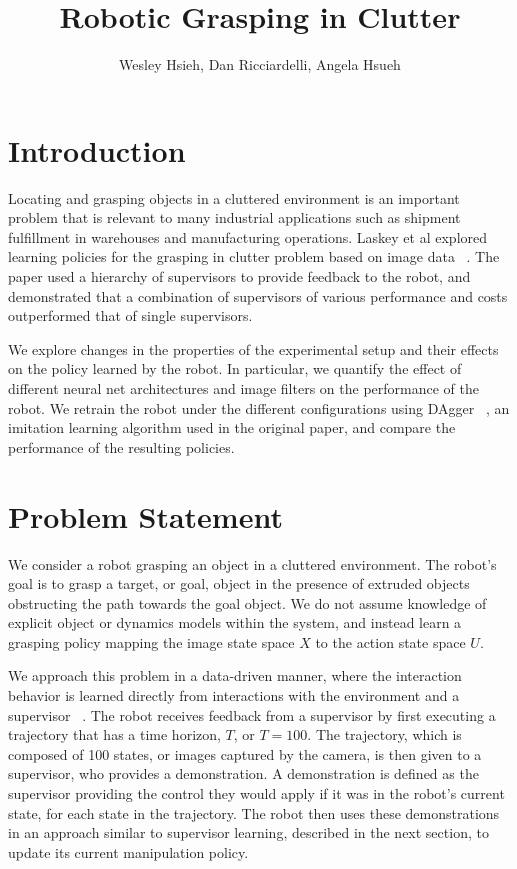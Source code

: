 \documentclass[10pt, conference]{ieeeconf}      %
\title{Robotic Grasping in Clutter}
\author{Wesley Hsieh, Dan Ricciardelli, Angela Hsueh}
\begin{document}
\maketitle
\thispagestyle{empty}
\pagestyle{empty}


\section{Introduction} 
Locating and grasping objects in a cluttered environment is an important problem that is relevant to many industrial applications such as shipment fulfillment in warehouses and manufacturing operations. Laskey et al explored learning policies for the grasping in clutter problem based on image data ~\cite{hierarchical_supervisors}. The paper used a hierarchy of supervisors to provide feedback to the robot, and demonstrated that a combination of supervisors of various performance and costs outperformed that of single supervisors. 

We explore changes in the properties of the experimental setup and their effects on the policy learned by the robot. In particular, we quantify the effect of different neural net architectures and image filters on the performance of the robot. We retrain the robot under the different configurations using DAgger ~\cite{ross2010reduction}, an imitation learning algorithm used in the original paper, and compare the performance of the resulting policies.

\section{Problem Statement}
We consider a robot grasping an object in a cluttered
environment. The robot's goal is to grasp a target, or goal,
object in the presence of extruded objects obstructing the
path towards the goal object. We do not assume knowledge of explicit
object or dynamics models within the system, and instead learn a grasping policy mapping the image state space $X$ to the action state space $U$. 

We approach this problem in a data-driven manner, where the interaction behavior is
learned directly from interactions with the environment and
a supervisor ~\cite{argall2009survey}. The robot receives feedback from a supervisor by first executing a trajectory that has a time horizon, $T$, or $T = 100$.
The trajectory, which is composed of 100 states, or images
captured by the camera, is then given to a supervisor, who
provides a demonstration. A demonstration is defined as the
supervisor providing the control they would apply if it was in
the robot's current state, for each state in the trajectory. The
robot then uses these demonstrations in an approach similar
to supervisor learning, described in the next section, to update its
current manipulation policy.
\end{document}
